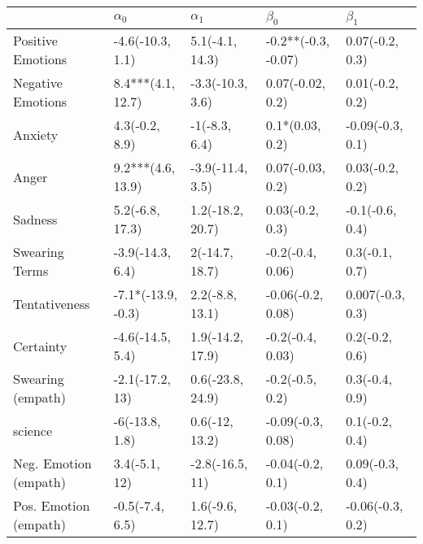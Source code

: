 \begin{tabular}{lllll}
\toprule
{} &          $\alpha_0$ &        $\alpha_1$ &            $\beta_0$ &         $\beta_1$ \\
\midrule
Positive Emotions     &    -4.6(-10.3, 1.1) &   5.1(-4.1, 14.3) &  -0.2**(-0.3, -0.07) &   0.07(-0.2, 0.3) \\
Negative Emotions     &   8.4***(4.1, 12.7) &  -3.3(-10.3, 3.6) &     0.07(-0.02, 0.2) &   0.01(-0.2, 0.2) \\
Anxiety               &      4.3(-0.2, 8.9) &     -1(-8.3, 6.4) &      0.1*(0.03, 0.2) &  -0.09(-0.3, 0.1) \\
Anger                 &   9.2***(4.6, 13.9) &  -3.9(-11.4, 3.5) &     0.07(-0.03, 0.2) &   0.03(-0.2, 0.2) \\
Sadness               &     5.2(-6.8, 17.3) &  1.2(-18.2, 20.7) &      0.03(-0.2, 0.3) &   -0.1(-0.6, 0.4) \\
Swearing Terms        &    -3.9(-14.3, 6.4) &    2(-14.7, 18.7) &     -0.2(-0.4, 0.06) &    0.3(-0.1, 0.7) \\
Tentativeness         &  -7.1*(-13.9, -0.3) &   2.2(-8.8, 13.1) &    -0.06(-0.2, 0.08) &  0.007(-0.3, 0.3) \\
Certainty             &    -4.6(-14.5, 5.4) &  1.9(-14.2, 17.9) &     -0.2(-0.4, 0.03) &    0.2(-0.2, 0.6) \\
Swearing (empath)     &     -2.1(-17.2, 13) &  0.6(-23.8, 24.9) &      -0.2(-0.5, 0.2) &    0.3(-0.4, 0.9) \\
science               &      -6(-13.8, 1.8) &    0.6(-12, 13.2) &    -0.09(-0.3, 0.08) &    0.1(-0.2, 0.4) \\
Neg. Emotion (empath) &       3.4(-5.1, 12) &   -2.8(-16.5, 11) &     -0.04(-0.2, 0.1) &   0.09(-0.3, 0.4) \\
Pos. Emotion (empath) &     -0.5(-7.4, 6.5) &   1.6(-9.6, 12.7) &     -0.03(-0.2, 0.1) &  -0.06(-0.3, 0.2) \\
\bottomrule
\end{tabular}
